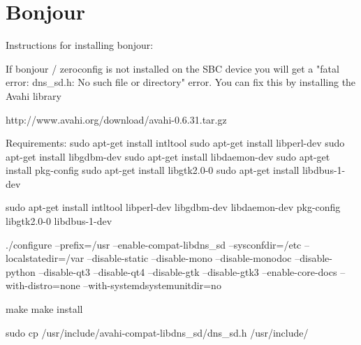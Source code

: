 \section{Bonjour}

Instructions for installing bonjour:

If bonjour / zeroconfig is not installed on the SBC device you will get a "fatal error: dns\_sd.h: No such file or directory" error. You can fix this by installing the Avahi library

http://www.avahi.org/download/avahi-0.6.31.tar.gz

Requirements:
sudo apt-get install intltool
sudo apt-get install libperl-dev
sudo apt-get install libgdbm-dev
sudo apt-get install libdaemon-dev
sudo apt-get install pkg-config
sudo apt-get install libgtk2.0-0
sudo apt-get install libdbus-1-dev

sudo apt-get install intltool libperl-dev libgdbm-dev libdaemon-dev pkg-config libgtk2.0-0 libdbus-1-dev


./configure --prefix=/usr  --enable-compat-libdns\_sd  --sysconfdir=/etc  --localstatedir=/var  --disable-static  --disable-mono  --disable-monodoc  --disable-python  --disable-qt3  --disable-qt4   --disable-gtk  --disable-gtk3  --enable-core-docs  --with-distro=none --with-systemdsystemunitdir=no




make
make install

sudo cp /usr/include/avahi-compat-libdns\_sd/dns\_sd.h /usr/include/